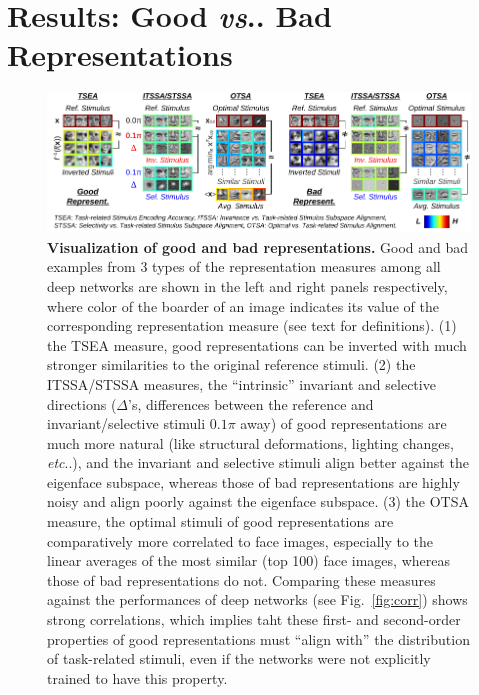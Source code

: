 \documentclass[fleqn]{article} %
\makeatletter
\DeclareRobustCommand\onedot{\futurelet\@let@token\@onedot}
\def\@onedot{\ifx\@let@token.\else.\null\fi\xspace}
\def\eg{\emph{e.g}\onedot} \def\Eg{\emph{E.g}\onedot}
\def\etc{\emph{etc}\onedot} \def\vs{\emph{vs}\onedot}
\makeatother
\begin{document}

\section{Results: Good \vs Bad Representations}
\label{sec:results2}

\begin{figure}[t]
\centering \includegraphics[width=\textwidth, trim=1.0ex 0.5ex 0 0, clip]{Figs/g_vs_b_repr.pdf} 
\caption{{\bf Visualization of good and bad representations.}
Good and bad examples from 3 types of the representation measures among all deep networks are shown in the left and right panels respectively, where color of the boarder of an image indicates its value of the corresponding representation measure (see text for definitions). %
(1) \Wrt the TSEA measure, good representations can be inverted with much stronger similarities to the original reference stimuli.
(2) \Wrt the ITSSA/STSSA measures, the ``intrinsic'' invariant and selective directions ($\Delta$'s, differences between the reference and invariant/selective stimuli $0.1\pi$ away) of good representations are much more natural (like structural deformations, lighting changes, \etc), and the invariant and selective stimuli align better against the eigenface subspace, whereas those of bad representations are highly noisy and align poorly against the eigenface subspace.
(3) \Wrt the OTSA measure, the optimal stimuli of good representations are comparatively more correlated to face images, especially to the linear averages of the most similar (top 100) face images, whereas those of bad representations do not.
Comparing these measures against the performances of deep networks (see Fig.~\ref{fig:corr}) shows strong correlations, which implies taht these first- and second-order properties of good representations must ``align with'' the distribution of task-related stimuli, even if the networks were not explicitly trained to have this property.
}
\label{fig:allrep2}
\end{figure}
\end{document}
